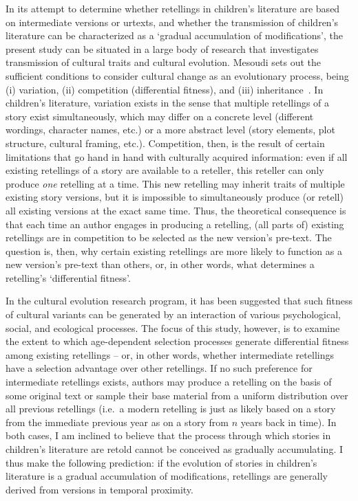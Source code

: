 In its attempt to determine whether retellings in children's literature are based on intermediate versions or urtexts, and whether the transmission of children's literature can be characterized as a `gradual accumulation of modifications', the present study can be situated in a large body of research that investigates transmission of cultural traits and cultural evolution. Mesoudi sets out the sufficient conditions to consider cultural change as an evolutionary process, being (i) variation, (ii) competition (differential fitness), and (iii) inheritance~\autocite{Mesoudi:2009hx,mesoudi:2011}. In children's literature, variation exists in the sense that multiple retellings of a story exist simultaneously, which may differ on a concrete level (different wordings, character names, etc.) or a more abstract level (story elements, plot structure, cultural framing, etc.). Competition, then, is the result of certain limitations that go hand in hand with culturally acquired information: even if all existing retellings of a story are available to a reteller, this reteller can only produce \emph{one} retelling at a time. This new retelling may inherit traits of multiple existing story versions, but it is impossible to simultaneously produce (or retell) all existing versions at the exact same time. Thus, the theoretical consequence is that each time an author engages in producing a retelling, (all parts of) existing retellings are in competition to be selected as the new version's pre-text. The question is, then, why certain existing retellings are more likely to function as a new version's pre-text than others, or, in other words, what determines a retelling's `differential fitness'. 

In the cultural evolution research program, it has been suggested that such fitness of cultural variants can be generated by an interaction of various psychological, social, and ecological processes.\autocites[See e.g.][]{Henrich:2008}[Henrich et al.'s account is compatible with ecological perspectives on cultural change, such as][]{mark:1998,lieberson:2000,venrooij:2015}[For a recent discussion of the notion of `cultural fitness', see][]{ramsey:2015} The focus of this study, however, is to examine the extent to which age-dependent selection processes generate differential fitness among existing retellings -- or, in other words, whether intermediate retellings have a selection advantage over other retellings. If no such preference for intermediate retellings exists, authors may produce a retelling on the basis of some original text or sample their base material from a uniform distribution over all previous retellings (i.e.\ a modern retelling is just as likely based on a story from the immediate previous year as on a story from $n$ years back in time). In both cases, I am inclined to believe that the process through which stories in children's literature are retold cannot be conceived as gradually accumulating. I thus make the following prediction: if the evolution of stories in children's literature is a gradual accumulation of modifications, retellings are generally derived from versions in temporal proximity. 

